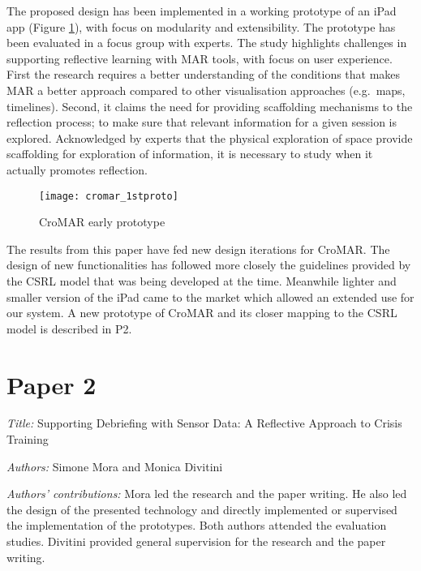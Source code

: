 The proposed design has been implemented in a working prototype of an iPad app (Figure \ref{fig:cromar-prototype}), with focus on modularity and extensibility. The prototype has been evaluated in a focus group with experts. The study highlights challenges in supporting reflective learning with MAR tools, with focus on user experience. First the research requires a better understanding of the conditions that makes MAR a better approach compared to other visualisation approaches (e.g.~maps, timelines). Second, it claims the need for providing scaffolding mechanisms to the reflection process; to make sure that relevant information for a given session is explored. Acknowledged by experts that the physical exploration of space provide scaffolding for exploration of information, it is necessary to study when it actually promotes reflection. 

\begin{figure}
	[tbh] \centering 
	\texttt{[image: cromar\_1stproto]} \caption{CroMAR early prototype} \label{fig:cromar-prototype} 
\end{figure}


The results from this paper have fed new design iterations for CroMAR. The design of new functionalities has followed more closely the guidelines provided by the CSRL model that was being developed at the time. Meanwhile lighter and smaller version of the iPad came to the market which allowed an extended use for our system. A new prototype of CroMAR and its closer mapping to the CSRL model is described in P2.


\section[P2: Supporting Debriefing with Sensor Data: A Reflective Approach to Crisis Training]{Paper 2}\label{paper-2}

\emph{Title:} Supporting Debriefing with Sensor Data: A Reflective Approach to Crisis Training

\emph{Authors:} Simone Mora and Monica Divitini

\emph{Authors' contributions:} Mora led the research and the paper writing. He also led the design of the presented technology and directly implemented or supervised the implementation of the prototypes. Both authors attended the evaluation studies. Divitini provided general supervision for the research and the paper writing.

